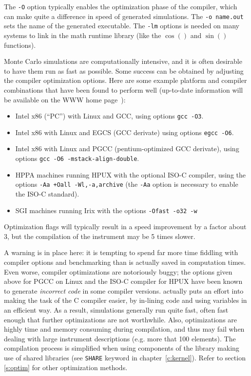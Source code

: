 The \verb+-O+ option typically enables the optimization phase of the compiler,
which can make quite a difference in speed of \MCS generated simulations. The
\verb+-o name.out+ sets the name of the generated executable. The \verb+-lm+
options is needed on many systems to link in the math runtime library (like the
$\cos()$ and $\sin()$ functions). 

Monte Carlo simulations are computationally intensive, and it is often desirable
to have them run as fast as possible. Some success can be obtained by adjusting
the compiler optimization options. Here are some example platform and compiler
combinations that have been found to perform well (up-to-date information will
be available on the \MCS WWW home page~\cite{mcstas_webpage}):
\begin{itemize}
\item Intel x86 (``PC'') with Linux and GCC, using options \verb+gcc -O3+.
\item Intel x86 with Linux and EGCS (GCC derivate) using
  options \verb+egcc -O6+.
\item Intel x86 with Linux and PGCC (pentium-optimized GCC derivate), using
  options \verb+gcc -O6 -mstack-align-double+.
\item HPPA machines running HPUX with the optional ISO-C compiler,
  using the options
  \verb|-Aa +Oall -Wl,-a,archive| (the \verb+-Aa+ option is necessary to
  enable the ISO-C standard).
\item SGI machines running Irix with the options
  \verb|-Ofast -o32 -w|
\end{itemize}
Optimization flags will typically result in a speed improvement by a factor
about 3, but the compilation of the instrument may be 5 times slower.

A warning is in place here: it is tempting to spend far more time fiddling with
compiler options and benchmarking than is actually saved in computation
times. Even worse, compiler optimizations are notoriously buggy; the options
given above for PGCC on Linux and the ISO-C compiler for HPUX have been known to
generate \emph{incorrect code} in some compiler versions. \MCS actually puts an
effort into making the task of the C compiler easier, by in-lining code and
using variables in an efficient way. As a result, \MCS simulations generally
run quite fast, often fast enough that further optimizations are not
worthwhile. Also, optimizations are highly time and memory consuming during
compilation, and thus may fail when dealing with large instrument descriptions
(e.g. more that 100 elements). The compilation process is simplified when using
components of the library making use of shared libraries (see \verb+SHARE+
keyword in chapter~\ref{c:kernel}). Refer to section \ref{s:optim} for other
optimization methods.

